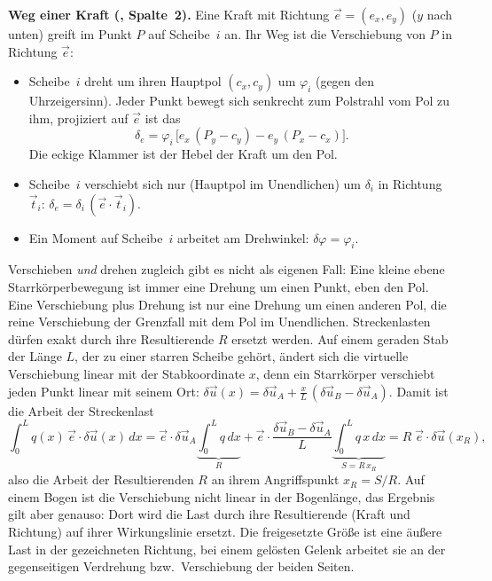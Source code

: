\textbf{Weg einer Kraft (, Spalte~2).} Eine Kraft mit Richtung
$\vec e = (e_x, e_y)$ ($y$ nach unten) greift im Punkt $P$ auf Scheibe~$i$ an. Ihr Weg ist die
Verschiebung von $P$ in Richtung $\vec e$:
\begin{itemize}
  \item Scheibe~$i$ dreht um ihren Hauptpol $(c_x, c_y)$ um $\varphi_i$ (gegen den Uhrzeigersinn).
        Jeder Punkt bewegt sich senkrecht zum Polstrahl vom Pol zu ihm, projiziert auf $\vec e$ ist das
        \[
          \delta_e = \varphi_i\,\bigl[e_x\,(P_y - c_y) - e_y\,(P_x - c_x)\bigr] .
        \]
        Die eckige Klammer ist der Hebel der Kraft um den Pol.
  \item Scheibe~$i$ verschiebt sich nur (Hauptpol im Unendlichen) um $\delta_i$ in Richtung
        $\vec t_i$: $\delta_e = \delta_i\,(\vec e\cdot\vec t_i)$.
  \item Ein Moment auf Scheibe~$i$ arbeitet am Drehwinkel: $\delta\varphi = \varphi_i$.
\end{itemize}
Verschieben \emph{und} drehen zugleich gibt es nicht als eigenen Fall: Eine kleine ebene
Starrkörperbewegung ist immer eine Drehung um einen Punkt, eben den Pol. Eine Verschiebung plus
Drehung ist nur eine Drehung um einen anderen Pol, die reine Verschiebung der Grenzfall mit dem Pol
im Unendlichen.
Streckenlasten dürfen exakt durch ihre Resultierende $R$ ersetzt werden. Auf einem geraden Stab
der Länge $L$, der zu einer starren Scheibe gehört, ändert sich die virtuelle Verschiebung linear
mit der Stabkoordinate $x$, denn ein Starrkörper verschiebt jeden Punkt linear mit seinem Ort:
$\delta\vec u(x) = \delta\vec u_A + \frac{x}{L}\,(\delta\vec u_B - \delta\vec u_A)$. Damit ist die
Arbeit der Streckenlast
\[
  \int_0^L q(x)\,\vec e\cdot\delta\vec u(x)\,dx
  = \vec e\cdot\delta\vec u_A \underbrace{\int_0^L q\,dx}_{R}
    + \vec e\cdot\frac{\delta\vec u_B - \delta\vec u_A}{L} \underbrace{\int_0^L q\,x\,dx}_{S = R\,x_R}
  = R\;\vec e\cdot\delta\vec u(x_R) ,
\]
also die Arbeit der Resultierenden $R$ an ihrem Angriffspunkt $x_R = S/R$. Auf einem Bogen ist die
Verschiebung nicht linear in der Bogenlänge, das Ergebnis gilt aber genauso: Dort wird die Last
durch ihre Resultierende (Kraft und Richtung) auf ihrer Wirkungslinie ersetzt. Die freigesetzte
Größe ist eine äußere Last in der gezeichneten Richtung, bei einem gelösten Gelenk arbeitet sie an
der gegenseitigen Verdrehung bzw.\ Verschiebung der beiden Seiten.

